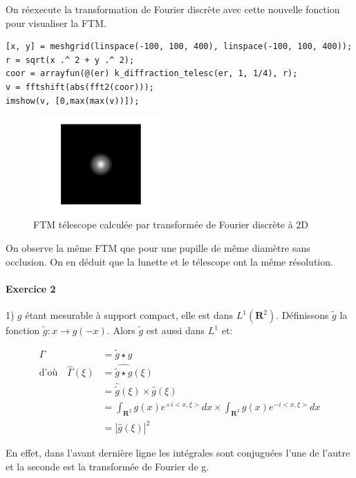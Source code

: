 \documentclass[a4paper, 11pt]{article}
\begin{document}
On réexecute la transformation de Fourier discrète avec cette nouvelle fonction pour visualiser la FTM.

\begin{lstlisting}[frame=single]
[x, y] = meshgrid(linspace(-100, 100, 400), linspace(-100, 100, 400));
r = sqrt(x .^ 2 + y .^ 2);
coor = arrayfun(@(er) k_diffraction_telesc(er, 1, 1/4), r);
v = fftshift(abs(fft2(coor)));
imshow(v, [0,max(max(v))]);
\end{lstlisting}

\begin{figure}[!h]
\centering
\includegraphics[width=5cm]{ftm_telesc_fft2.png}
\caption{FTM télescope calculée par transformée de Fourier discrète à 2D}
\end{figure}

On observe la même FTM que pour une pupille de même diamètre sans occlusion. On en déduit que la lunette et le télescope
ont la même résolution. 

\paragraph{Exercice 2}


1) $g$ étant mesurable à support compact, elle est dans $L^1(\mathbf{R}^2)$. Définissons $\tilde{g}$ la fonction
$\tilde{g} : x \to g(-x)$. Alors $\tilde{g}$ est aussi dans $L^1$ et:

\begin{align*}
\Gamma & = \tilde{g} \star g \\
\text{d'où} \quad \hat{\Gamma}(\xi) & = \widehat{\tilde{g} \star g}(\xi) \\ 
& = \hat{\tilde{g}}(\xi) \times \hat{g}(\xi) \\
& = \int_{\mathbf{R}^2} g(x) e^{+i<x,\xi>} dx \times \int_{\mathbf{R}^2} g(x) e^{-i<x,\xi>} dx \\
& = \left|\hat{g}(\xi)\right|^2
\end{align*}

En effet, dans l'avant dernière ligne les intégrales sont conjuguées l'une de l'autre et la seconde est la transformée
de Fourier de g.
\end{document}
